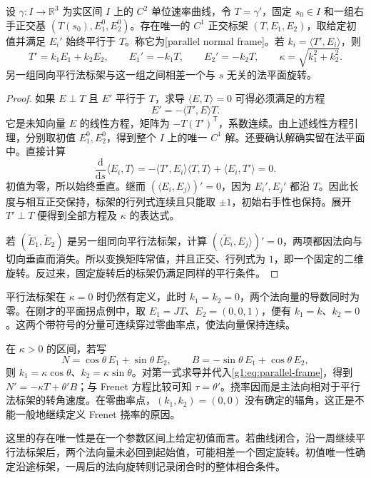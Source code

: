 \begin{theorem}\label{g1:thm:parallel-normal-frame}
	设 \(\gamma:I\to\mathbb R^3\) 为实区间 \(I\) 上的 \(C^2\) 单位速率曲线，令 \(T=\gamma'\)，固定 \(s_0\in I\) 和一组右手正交基 \((T(s_0),E_1^0,E_2^0)\)。存在唯一的 \(C^1\) 正交标架 \((T,E_1,E_2)\)，取给定初值并满足 \(E_i'\) 始终平行于 \(T\)。称它为[parallel normal frame]。若 \(k_i=\langle T',E_i\rangle\)，则
	\begin{equation}\label{g1:eq:parallel-frame}
		T'=k_1E_1+k_2E_2,\qquad E_1'=-k_1T,\qquad E_2'=-k_2T,\qquad
		\kappa=\sqrt{k_1^2+k_2^2}.
	\end{equation}
	另一组同向平行法标架与这一组之间相差一个与 \(s\) 无关的法平面旋转。
\end{theorem}
\begin{proof}
	如果 \(E\perp T\) 且 \(E'\) 平行于 \(T\)，求导 \(\langle E,T\rangle=0\) 可得必须满足的方程
	\[
		E'=-\langle T',E\rangle T.
	\]
	它是未知向量 \(E\) 的线性方程，矩阵为 \(-T(T')^{\mathsf T}\)，系数连续。由上述线性方程引理，分别取初值 \(E_1^0,E_2^0\)，得到整个 \(I\) 上的唯一 \(C^1\) 解。还要确认解确实留在法平面中。直接计算
	\[
		\frac{\mathrm d}{\mathrm ds}\langle E_i,T\rangle
		=-\langle T',E_i\rangle\langle T,T\rangle+\langle E_i,T'\rangle=0.
	\]
	初值为零，所以始终垂直。继而 \((\langle E_i,E_j\rangle)'=0\)，因为 \(E_i',E_j'\) 都沿 \(T\)。因此长度与相互正交保持，标架的行列式连续且只能取 \(\pm1\)，初始右手性也保持。展开 \(T'\perp T\) 便得到全部方程及 \(\kappa\) 的表达式。

	若 \((\widetilde E_1,\widetilde E_2)\) 是另一组同向平行法标架，计算 \((\langle\widetilde E_i,E_j\rangle)'=0\)，两项都因法向与切向垂直而消失。所以变换矩阵常值，并且正交、行列式为 \(1\)，即一个固定的二维旋转。反过来，固定旋转后的标架仍满足同样的平行条件。
\end{proof}

平行法标架在 \(\kappa=0\) 时仍然有定义，此时 \(k_1=k_2=0\)，两个法向量的导数同时为零。在刚才的平面拐点例中，取 \(E_1=JT\)、\(E_2=(0,0,1)\)，便有 \(k_1=k\)、\(k_2=0\)。这两个带符号的分量可连续穿过零曲率点，使法向量保持连续。

\ProseParagraphBreak

在 \(\kappa>0\) 的区间，若写
\[
	N=\cos\theta\,E_1+\sin\theta\,E_2,\qquad
	B=-\sin\theta\,E_1+\cos\theta\,E_2,
\]
则 \(k_1=\kappa\cos\theta\)、\(k_2=\kappa\sin\theta\)。对第一式求导并代入\eqref{g1:eq:parallel-frame}，得到 \(N'=-\kappa T+\theta'B\)；与 Frenet 方程比较可知 \(\tau=\theta'\)。挠率因而是主法向相对于平行法标架的转角速度。在零曲率点，\((k_1,k_2)=(0,0)\) 没有确定的辐角，这正是不能一般地继续定义 Frenet 挠率的原因。

\ProseParagraphBreak

这里的存在唯一性是在一个参数区间上给定初值而言。若曲线闭合，沿一周继续平行法标架后，两个法向量未必回到起始值，可能相差一个固定旋转。初值唯一性确定沿途标架，一周后的法向旋转则记录闭合时的整体相合条件。
